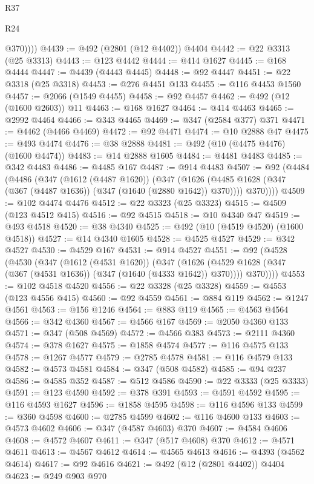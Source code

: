 \begin{lexlean}{R37}
\begin{lexlean}{R24}
\begin{coremodule}
{{{{{{{{{{{{{{{{{{{{{{{{{{{{{{{{{{{{{{{{{{{{{{{{{{{{{{{{{{{{{{{{{{{{{{{{{{{{{{{{{{{{{{{{{{{{{{{{{{{{{{{{{{{{{{{{{{{{{{{{{{{{{{{{{{{{{{{{{{{{{{{{{{{{{{{{{{{{{{{{{{{{{{{{{{{{{{{{{{{{{{{{{            @370))))
@4439 := @492 (@2801 (@12 @4402)) @4404
@4442 := @22 @3313 (@25 @3313)
@4443 := @123 @4442
@4444 := @414 @1627
@4445 := @168 @4444
@4447 := @4439 (@4443 @4445)
@4448 := @92 @4447
@4451 := @22 @3318 (@25 @3318)
@4453 := @276 @4451 @133
@4455 := @116 @4453 @1560
@4457 := @2066 (@1549 @4455)
@4458 := @92 @4457
@4462 := @492 (@12 (@1600 @2603)) @11
@4463 := @168 @1627
@4464 := @414 @4463
@4465 := @2992 @4464
@4466 := @343 @4465
@4469 := @347 (@2584 @377) @371
@4471 := @4462 (@4466 @4469)
@4472 := @92 @4471
@4474 := @10 @2888 @47
@4475 := @493 @4474
@4476 := @38 @2888
@4481 := @492 (@10 (@4475 @4476) (@1600 @4474))
@4483 := @14 @2888 @1605
@4484 := @4481 @4483
@4485 := @342 @4483
@4486 := @4485 @167
@4487 := @914 @4483
@4507 := @92
    (@4484
      (@4486
        (@347
          (@1612 (@4487 @1620))
          (@347
            (@1626 (@4485 @1628 (@347 (@367 (@4487 @1636)) (@347 (@1640 (@2880 @1642)) @370))))
            @370))))
@4509 := @102 @4474 @4476
@4512 := @22 @3323 (@25 @3323)
@4515 := @4509 (@123 @4512 @415)
@4516 := @92 @4515
@4518 := @10 @4340 @47
@4519 := @493 @4518
@4520 := @38 @4340
@4525 := @492 (@10 (@4519 @4520) (@1600 @4518))
@4527 := @14 @4340 @1605
@4528 := @4525 @4527
@4529 := @342 @4527
@4530 := @4529 @167
@4531 := @914 @4527
@4551 := @92
    (@4528
      (@4530
        (@347
          (@1612 (@4531 @1620))
          (@347
            (@1626 (@4529 @1628 (@347 (@367 (@4531 @1636)) (@347 (@1640 (@4333 @1642)) @370))))
            @370))))
@4553 := @102 @4518 @4520
@4556 := @22 @3328 (@25 @3328)
@4559 := @4553 (@123 @4556 @415)
@4560 := @92 @4559
@4561 := @884 @119
@4562 := @1247 @4561
@4563 := @156 @1246
@4564 := @883 @119
@4565 := @4563 @4564
@4566 := @342 @4360
@4567 := @4566 @167
@4569 := @2050 @4360 @133
@4571 := @347 (@508 @4569)
@4572 := @4566 @383
@4573 := @2111 @4360
@4574 := @378 @1627
@4575 := @1858 @4574
@4577 := @116 @4575 @133
@4578 := @1267 @4577
@4579 := @2785 @4578
@4581 := @116 @4579 @133
@4582 := @4573 @4581
@4584 := @347 (@508 @4582)
@4585 := @94 @237
@4586 := @4585 @352
@4587 := @512 @4586
@4590 := @22 @3333 (@25 @3333)
@4591 := @123 @4590
@4592 := @378 @391
@4593 := @4591 @4592
@4595 := @116 @4593 @1627
@4596 := @1858 @4595
@4598 := @116 @4596 @133
@4599 := @360 @4598
@4600 := @2785 @4599
@4602 := @116 @4600 @133
@4603 := @4573 @4602
@4606 := @347 (@4587 @4603) @370
@4607 := @4584 @4606
@4608 := @4572 @4607
@4611 := @347 (@517 @4608) @370
@4612 := @4571 @4611
@4613 := @4567 @4612
@4614 := @4565 @4613
@4616 := @4393 (@4562 @4614)
@4617 := @92 @4616
@4621 := @492 (@12 (@2801 @4402)) @4404
@4623 := @249 @903 @970
}}}}}}}}}}}}}}}}}}}}}}}}}}}}}}}}}}}}}}}}}}}}}}}}}}}}}}}}}}}}}}}}}}}}}}}}}}}}}}}}}}}}}}}}}}}}}}}}}}}}}}}}}}}}}}}}}}}}}}}}}}}}}}}}}}}}}}}}}}}}}}}}}}}}}}}}}}}}}}}}}}}}}}}}}}}}}}}}}}}}}}}}}
\end{coremodule}
\end{lexlean}
\end{lexlean}
